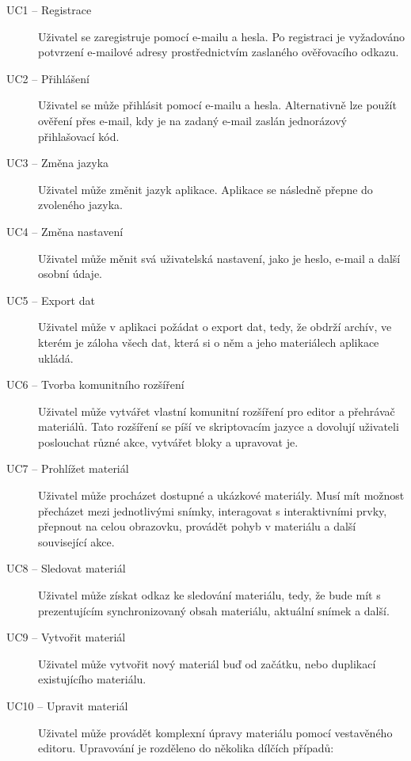 \begin{description}
    \item[UC1 -- Registrace]
    Uživatel se zaregistruje pomocí e-mailu a hesla. Po registraci je vyžadováno potvrzení e-mailové adresy prostřednictvím zaslaného ověřovacího odkazu.

    \item[UC2 -- Přihlášení]
    Uživatel se může přihlásit pomocí e-mailu a hesla. Alternativně lze použít ověření přes e-mail, kdy je na zadaný e-mail zaslán jednorázový přihlašovací kód.
    
    \item[UC3 -- Změna jazyka]
    Uživatel může změnit jazyk aplikace. Aplikace se následně přepne do zvoleného jazyka. 

    \item[UC4 -- Změna nastavení]
    Uživatel může měnit svá uživatelská nastavení, jako je heslo, e-mail a další osobní údaje.
    
    \item[UC5 -- Export dat]
    Uživatel může v aplikaci požádat o export dat, tedy, že obdrží archív, ve kterém je záloha všech dat, která si o něm a jeho materiálech aplikace ukládá.
    
    
    \item[UC6 -- Tvorba komunitního rozšíření]
    Uživatel může vytvářet vlastní komunitní rozšíření pro editor a přehrávač materiálů. Tato rozšíření se píší ve skriptovacím jazyce a dovolují uživateli poslouchat různé akce, vytvářet bloky a upravovat je.
    
    \item[UC7 -- Prohlížet materiál]
    Uživatel může procházet dostupné a ukázkové materiály. Musí mít možnost přecházet mezi jednotlivými snímky, interagovat s interaktivními prvky, přepnout na celou obrazovku, provádět pohyb v materiálu a další související akce.
    
    \item[UC8 -- Sledovat materiál]
    Uživatel může získat odkaz ke sledování materiálu, tedy, že bude mít s prezentujícím synchronizovaný obsah materiálu, aktuální snímek a další.
    
    \item[UC9 -- Vytvořit materiál]
    Uživatel může vytvořit nový materiál buď od začátku, nebo duplikací existujícího materiálu.
    
    \item[UC10 -- Upravit materiál]
    Uživatel může provádět komplexní úpravy materiálu pomocí vestavěného editoru. Upravování je rozděleno do několika dílčích případů:
        

\end{description}
